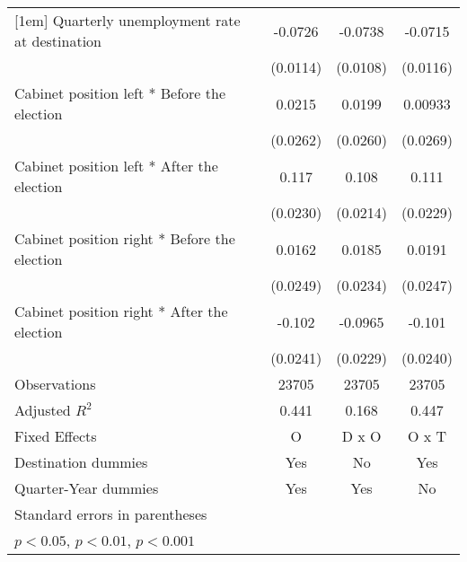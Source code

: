 \begin{table}[htbp]
\begin{tabular}{l*{3}{c}}
[1em]
Quarterly unemployment rate at destination&     -0.0726\sym{***}&     -0.0738\sym{***}&     -0.0715\sym{***}\\
                    &    (0.0114)         &    (0.0108)         &    (0.0116)         \\
[1em]
Cabinet position left * Before the election&      0.0215         &      0.0199         &     0.00933         \\
                    &    (0.0262)         &    (0.0260)         &    (0.0269)         \\
[1em]
Cabinet position left * After the election&       0.117\sym{***}&       0.108\sym{***}&       0.111\sym{***}\\
                    &    (0.0230)         &    (0.0214)         &    (0.0229)         \\
[1em]
Cabinet position right * Before the election&      0.0162         &      0.0185         &      0.0191         \\
                    &    (0.0249)         &    (0.0234)         &    (0.0247)         \\
[1em]
Cabinet position right * After the election&      -0.102\sym{***}&     -0.0965\sym{***}&      -0.101\sym{***}\\
                    &    (0.0241)         &    (0.0229)         &    (0.0240)         \\
\hline
Observations        &       23705         &       23705         &       23705         \\
Adjusted \(R^{2}\)  &       0.441         &       0.168         &       0.447         \\
Fixed Effects       &           O         &       D x O         &       O x T         \\
Destination dummies &         Yes         &          No         &         Yes         \\
Quarter-Year dummies&         Yes         &         Yes         &          No         \\
\hline\hline
\multicolumn{4}{l}{\footnotesize Standard errors in parentheses}\\
\multicolumn{4}{l}{\footnotesize \sym{*} \(p<0.05\), \sym{**} \(p<0.01\), \sym{***} \(p<0.001\)}\\
\end{tabular}
\end{table}
